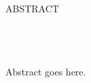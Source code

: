 \begin{doublespace}

\begin{centering}
{\Large ABSTRACT} \\
\Title \\
\Author \\
\Advisor \\
\end{centering}

\vspace*{1in}

Abstract goes here.

\end{doublespace}
